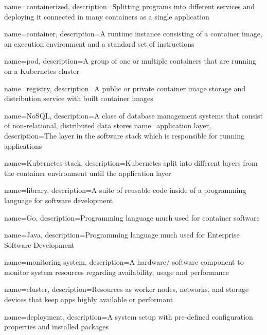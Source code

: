 {
    name={containerized},
    description={Splitting programs into different services and deploying it connected in many containers as a single application}
}

{
    name={container},
    description={A runtime instance consisting of a container image, an execution environment and a standard set of instructions}
}

{
    name={pod},
    description={A group of one or multiple containers that are running on a Kubernetes cluster}
}

{
    name={registry},
    description={A public or private container image storage and distribution service with built container images}
}

{
    name={NoSQL},
    description={A class of database management systems that consist of non-relational, distributed data stores}
}
{
    name={application layer},
    description={The layer in the software stack which is responsible for running applications}
}

{
    name={Kubernetes stack},
    description={Kubernetes split into different layers from the container environment until the application layer}
}

{
    name={library},
    description={A suite of reusable code inside of a programming language for software development}
}

{
    name={Go},
    description={Programming language much used for container software}
}

{
    name={Java},
    description={Programming language much used for Enterprise Software Development}
}

{
    name={monitoring system},
    description={A hardware/ software component to monitor system resources regarding availability, usage and performance}
}

{
    name={cluster},
    description={Resources as worker nodes, networks, and storage devices that keep apps highly available or performant}
}

{
    name={deployment},
    description={A system setup with pre-defined configuration properties and installed packages}
}

